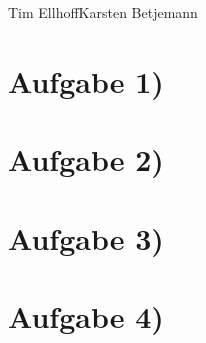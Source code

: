 \documentclass{swp1}
\begin{document}
          {Tim Ellhoff}{Karsten Betjemann}{}
          
\section*{Aufgabe 1)}

\section*{Aufgabe 2)}

\section*{Aufgabe 3)}

\section*{Aufgabe 4)}
\end{document}
